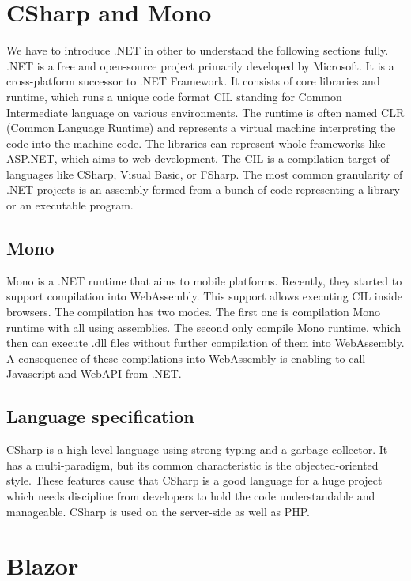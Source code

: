 \section{CSharp and Mono}

We have to introduce .NET \cite{17} in other to understand the following sections fully.
.NET is a free and open-source project primarily developed by Microsoft.
It is a cross-platform successor to .NET Framework.
It consists of core libraries and runtime, which runs a unique code format CIL standing for Common Intermediate language on various environments.
The runtime is often named CLR (Common Language Runtime) and represents a virtual machine interpreting the code into the machine code.
The libraries can represent whole frameworks like ASP.NET, which aims to web development.
The CIL is a compilation target of languages like CSharp, Visual Basic, or FSharp.
The most common granularity of .NET projects is an assembly formed from a bunch of code representing a library or an executable program.

\subsection{Mono}

Mono is a .NET runtime that aims to mobile platforms. 
Recently, they started to support compilation \cite{12} into WebAssembly.
This support allows executing CIL inside browsers.
The compilation has two modes.
The first one is compilation Mono runtime with all using assemblies.
The second only compile Mono runtime, which then can execute .dll files without further compilation of them into WebAssembly.
A consequence of these compilations into WebAssembly is enabling to call Javascript and WebAPI from .NET.

\subsection{Language specification}

CSharp is a high-level language using strong typing and a garbage collector.
It has a multi-paradigm, but its common characteristic is the objected-oriented style.
These features cause that CSharp is a good language for a huge project which needs discipline from developers to hold the code understandable and manageable.
CSharp is used on the server-side as well as PHP.

\section{Blazor}

